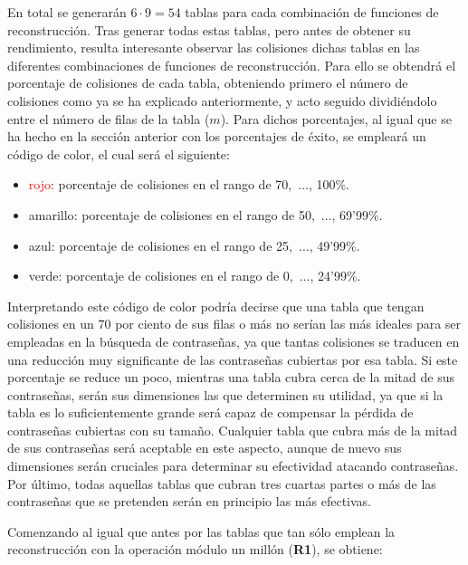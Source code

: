 \documentclass[12pt,spanish,listoffigures,listoftables]{tfgetsinf}
\begin{document}
En total se generarán $6 \cdot 9 = 54$ tablas para cada combinación de funciones de reconstrucción. Tras generar todas estas tablas, pero antes de obtener su rendimiento, resulta interesante observar las colisiones dichas tablas en las diferentes combinaciones de funciones de reconstrucción. Para ello se obtendrá el porcentaje de colisiones de cada tabla, obteniendo primero el número de colisiones como ya se ha explicado anteriormente, y acto seguido dividiéndolo entre el número de filas de la tabla ($m$). Para dichos porcentajes, al igual que se ha hecho en la sección anterior con los porcentajes de éxito, se empleará un código de color, el cual será el siguiente:

\begin{itemize}

    \item \textcolor{red}{rojo}: porcentaje de colisiones en el rango de 70,~$\dots$, 100\%.
    
    \item \textcolor{y}{amarillo}: porcentaje de colisiones en el rango de 50,~$\dots$, 69'99\%.
    
    \item \textcolor{b}{azul}: porcentaje de colisiones en el rango de 25,~$\dots$, 49'99\%.

    \item \textcolor{g}{verde}: porcentaje de colisiones en el rango de 0,~$\dots$, 24'99\%.
    
\end{itemize}

Interpretando este código de color podría decirse que una tabla que tengan colisiones en un 70 por ciento de sus filas o más no serían las más ideales para ser empleadas en la búsqueda de contraseñas, ya que tantas colisiones se traducen en una reducción muy significante de las contraseñas cubiertas por esa tabla. Si este porcentaje se reduce un poco, mientras una tabla cubra cerca de la mitad de sus contraseñas, serán sus dimensiones las que determinen su utilidad, ya que si la tabla es lo suficientemente grande será capaz de compensar la pérdida de contraseñas cubiertas con su tamaño. Cualquier tabla que cubra más de la mitad de sus contraseñas será aceptable en este aspecto, aunque de nuevo sus dimensiones serán cruciales para determinar su efectividad atacando contraseñas. Por último, todas aquellas tablas que cubran tres cuartas partes o más de las contraseñas que se pretenden serán en principio las más efectivas.

Comenzando al igual que antes por las tablas que tan sólo emplean la reconstrucción con la operación módulo un millón (\textbf{R1}), se obtiene:
\end{document}
